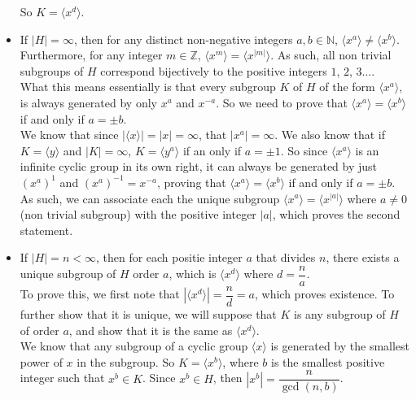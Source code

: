 \documentclass[12pt]{article}
\newcommand{\N}{\mathbb{N}}
\newcommand{\Z}{\mathbb{Z}}
\newcommand{\ang}[1]{\langle #1 \rangle}
\begin{document}
\begin{itemize}[label=$\diamond$]
            So $K = \ang{x^d}$.
        \item 
            If $|H| = \infty$,
            then for any distinct non-negative integers $a,b \in \N$,
            $\ang{x^a} \neq \ang{x^b}$.
            Furthermore, for any integer $m \in \Z$,
            $\ang{x^m} = \ang{x^{|m|}}$.
            As such, all non trivial subgroups of $H$
            correspond bijectively
            to the positive integers $1$, $2$, $3 \dots$. \\
            What this means essentially is that every subgroup $K$
            of $H$ of the form $\ang{x^a}$,
            is always generated by only $x^a$ and $x^{-a}$.
            So we need to prove that $\ang{x^a} = \ang{x^b}$
            if and only if $a = \pm b$. \\
            We know that since $|\ang{x}| = |x| = \infty$,
            that $|x^a| = \infty$.
            We also know that if $K = \ang{y}$ and $|K| = \infty$,
            $K = \ang{y^a}$ if an only if $a = \pm 1$.
            So since $\ang{x^a}$ is an infinite cyclic group
            in its own right,
            it can always be generated by
            just $(x^a)^1$ and $(x^{a})^{-1} = x^{-a}$,
            proving that $\ang{x^a} = \ang{x^b}$
            if and only if $a = \pm b$. \\
            As such, we can associate each the unique subgroup
            $\ang{x^a} = \ang{x^{|a|}}$
            where $a \neq 0$ (non trivial subgroup)
            with the positive integer $|a|$,
            which proves the second statement.
        \item
            If $|H| = n < \infty$,
            then for each positie integer $a$ that divides $n$,
            there exists a unique subgroup of $H$ order $a$,
            which is $\ang{x^d}$ where $d = \dfrac{n}{a}$. \\
            To prove this, 
            we first note that $|\ang{x^d}| = \dfrac{n}{d} = a$,
            which proves existence.
            To further show that it is unique,
            we will suppose that $K$ is any subgroup of $H$
            of order $a$,
            and show that it is the same as $\ang{x^d}$. \\
            We know that any subgroup of a cyclic group $\ang{x}$
            is generated by the smallest power of $x$ in the subgroup.
            So $K = \ang{x^b}$,
            where $b$ is the smallest positive integer such that
            $x^b \in K$.
            Since $x^b \in H$, then $|x^b| = \dfrac{n}{\gcd(n, b)}$.

\end{itemize}
\end{document}
